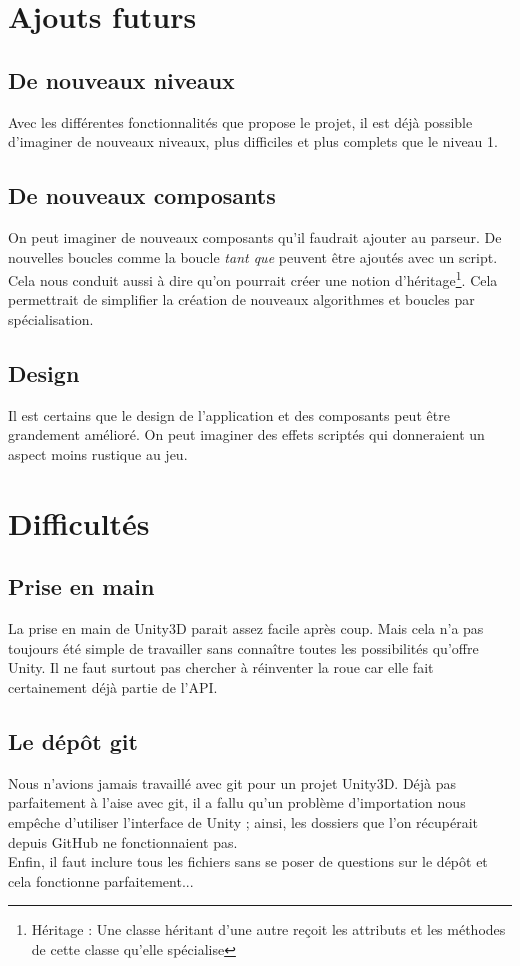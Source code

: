 \documentclass[a4paper,11pt]{myreport}
\begin{document}
\chapter{Ajouts futurs}
\section{De nouveaux niveaux}
\par Avec les différentes fonctionnalités que propose le projet, il est déjà possible d'imaginer de nouveaux niveaux, plus difficiles et plus complets que le niveau 1.
\section{De nouveaux composants}
\par On peut imaginer de nouveaux composants qu'il faudrait ajouter au parseur. De nouvelles boucles comme la boucle \textit{tant que} peuvent être ajoutés avec un script.\\
Cela nous conduit aussi à dire qu'on pourrait créer une notion d'héritage\footnote{Héritage : Une classe héritant d'une autre reçoit les attributs et les méthodes de cette classe qu'elle spécialise}. Cela permettrait de simplifier la création de nouveaux algorithmes et boucles par spécialisation.
\section{Design}
\par Il est certains que le design de l'application et des composants peut être grandement amélioré. On peut imaginer des effets scriptés qui donneraient un aspect moins rustique au jeu.
\chapter{Difficultés}
\section{Prise en main}
\par La prise en main de Unity3D parait assez facile après coup. Mais cela n'a pas toujours été simple de travailler sans connaître toutes les possibilités qu'offre Unity. Il ne faut surtout pas chercher à réinventer la roue car elle fait certainement déjà partie de l'API.
\section{Le dépôt git}
\par Nous n'avions jamais travaillé avec git pour un projet Unity3D. Déjà pas parfaitement à l'aise avec git, il a fallu qu'un problème d'importation nous empêche d'utiliser l'interface de Unity ; ainsi, les dossiers que l'on récupérait depuis GitHub ne fonctionnaient pas.\\
Enfin, il faut inclure tous les fichiers sans se poser de questions sur le dépôt et cela fonctionne parfaitement...
\end{document}
